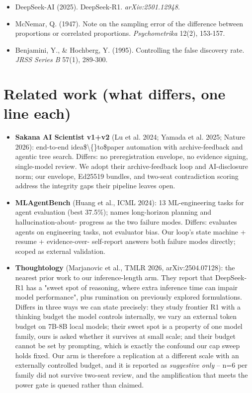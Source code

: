 \documentclass[11pt]{article}
\begin{document}
\begin{itemize}
\item DeepSeek-AI (2025). DeepSeek-R1. {\it arXiv:2501.12948}.
\item McNemar, Q. (1947). Note on the sampling error of the difference between proportions or correlated proportions. {\it Psychometrika} 12(2), 153-157.
\item Benjamini, Y., \& Hochberg, Y. (1995). Controlling the false discovery rate. {\it JRSS Series B} 57(1), 289-300.
\end{itemize}

\section*{Related work (what differs, one line each)}

\begin{itemize}
\item {\bf Sakana AI Scientist v1+v2} (Lu et al. 2024; Yamada et al. 2025; Nature 2026): end-to-end idea\$\textbackslash\{\}to\$paper automation with archive-feedback and agentic tree search. Differs: no preregistration envelope, no evidence signing, single-model review. We adopt their archive-feedback loop and AI-disclosure norm; our envelope, Ed25519 bundles, and two-seat contradiction scoring address the integrity gaps their pipeline leaves open.
\item {\bf MLAgentBench} (Huang et al., ICML 2024): 13 ML-engineering tasks for agent evaluation (best 37.5\%); names long-horizon planning and hallucination-about- progress as the two failure modes. Differs: evaluates agents on engineering tasks, not evaluator bias. Our loop's state machine + resume + evidence-over- self-report answers both failure modes directly; scoped as external validation.
\item {\bf Thoughtology} (Marjanovic et al., TMLR 2026, arXiv:2504.07128): the nearest prior work to our inference-length arm. They report that DeepSeek-R1 has a "sweet spot of reasoning, where extra inference time can impair model performance", plus rumination on previously explored formulations. Differs in three ways we can state precisely: they study frontier R1 with a thinking budget the model controls internally, we vary an external token budget on 7B-8B local models; their sweet spot is a property of one model family, ours is asked whether it survives at small scale; and their budget cannot be set by prompting, which is exactly the confound our cap sweep holds fixed. Our arm is therefore a replication at a different scale with an externally controlled budget, and it is reported as {\it suggestive only} -- n=6 per family did not survive two-seat review, and the amplification that meets the power gate is queued rather than claimed.

\end{itemize}
\end{document}
